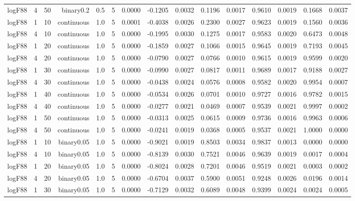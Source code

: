 \begin{longtable}{rrrrrrrrrrrrrrr}
  logF88 & 4 & 50 & binary0.2 & 0.5 & 5 & 0.0000 & -0.1205 & 0.0032 & 0.1196 & 0.0017 & 0.9610 & 0.0019 & 0.1668 & 0.0037 \\ 
  logF88 & 1 & 10 & continuous & 1.0 & 5 & 0.0001 & -0.4038 & 0.0026 & 0.2300 & 0.0027 & 0.9623 & 0.0019 & 0.1560 & 0.0036 \\ 
  logF88 & 4 & 10 & continuous & 1.0 & 5 & 0.0000 & -0.1995 & 0.0030 & 0.1275 & 0.0017 & 0.9583 & 0.0020 & 0.6473 & 0.0048 \\ 
  logF88 & 1 & 20 & continuous & 1.0 & 5 & 0.0000 & -0.1859 & 0.0027 & 0.1066 & 0.0015 & 0.9645 & 0.0019 & 0.7193 & 0.0045 \\ 
  logF88 & 4 & 20 & continuous & 1.0 & 5 & 0.0000 & -0.0790 & 0.0027 & 0.0766 & 0.0010 & 0.9615 & 0.0019 & 0.9599 & 0.0020 \\ 
  logF88 & 1 & 30 & continuous & 1.0 & 5 & 0.0000 & -0.0990 & 0.0027 & 0.0817 & 0.0011 & 0.9689 & 0.0017 & 0.9188 & 0.0027 \\ 
  logF88 & 4 & 30 & continuous & 1.0 & 5 & 0.0000 & -0.0438 & 0.0024 & 0.0576 & 0.0008 & 0.9582 & 0.0020 & 0.9954 & 0.0007 \\ 
  logF88 & 1 & 40 & continuous & 1.0 & 5 & 0.0000 & -0.0534 & 0.0026 & 0.0701 & 0.0010 & 0.9727 & 0.0016 & 0.9782 & 0.0015 \\ 
  logF88 & 4 & 40 & continuous & 1.0 & 5 & 0.0000 & -0.0277 & 0.0021 & 0.0469 & 0.0007 & 0.9539 & 0.0021 & 0.9997 & 0.0002 \\ 
  logF88 & 1 & 50 & continuous & 1.0 & 5 & 0.0000 & -0.0313 & 0.0025 & 0.0615 & 0.0009 & 0.9736 & 0.0016 & 0.9963 & 0.0006 \\ 
  logF88 & 4 & 50 & continuous & 1.0 & 5 & 0.0000 & -0.0241 & 0.0019 & 0.0368 & 0.0005 & 0.9537 & 0.0021 & 1.0000 & 0.0000 \\ 
  logF88 & 1 & 10 & binary0.05 & 1.0 & 5 & 0.0000 & -0.9021 & 0.0019 & 0.8503 & 0.0034 & 0.9837 & 0.0013 & 0.0000 & 0.0000 \\ 
  logF88 & 4 & 10 & binary0.05 & 1.0 & 5 & 0.0000 & -0.8139 & 0.0030 & 0.7521 & 0.0046 & 0.9639 & 0.0019 & 0.0017 & 0.0004 \\ 
  logF88 & 1 & 20 & binary0.05 & 1.0 & 5 & 0.0000 & -0.8024 & 0.0028 & 0.7201 & 0.0046 & 0.9519 & 0.0021 & 0.0003 & 0.0002 \\ 
  logF88 & 4 & 20 & binary0.05 & 1.0 & 5 & 0.0000 & -0.6704 & 0.0037 & 0.5900 & 0.0051 & 0.9248 & 0.0026 & 0.0196 & 0.0014 \\ 
  logF88 & 1 & 30 & binary0.05 & 1.0 & 5 & 0.0000 & -0.7129 & 0.0032 & 0.6089 & 0.0048 & 0.9399 & 0.0024 & 0.0024 & 0.0005 \\ 

\end{longtable}
